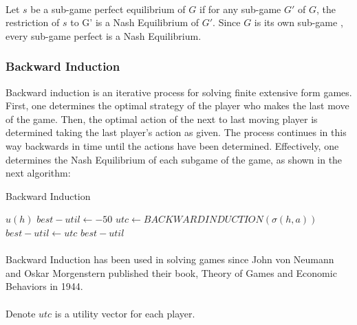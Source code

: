\paragraph{}Let $s$ be a  sub-game perfect equilibrium of $G$ if for any sub-game $G'$ of $G$, the restriction of $s$ to G' is a Nash Equilibrium of $G'$. Since $G$ is its own sub-game , every sub-game perfect is a Nash Equilibrium.

\subsubsection{Backward Induction}
Backward induction is an iterative process for solving finite extensive form games. First, one determines the optimal strategy of the player who makes the last move of the game. Then, the optimal action of the next to last moving player is determined taking the last player's action as given. The process continues in this way backwards in time until the actions have been determined. Effectively, one determines the Nash Equilibrium of each subgame of the game, as shown in the next algorithm:
\begin{algorithm}
\caption{Backward Induction\label{fig:scaled_back}}
\begin{algorithmic}
 \STATE $u(h)$
\ENDIF
\STATE $best-util \leftarrow -50$
\STATE $utc \leftarrow BACKWARDINDUCTION(\sigma(h,a))$ 
\STATE $best-util \leftarrow utc$
\ENDIF
\ENDFOR
\RETURN $best-util$
\end{algorithmic}
\end{algorithm}
\paragraph{}Backward Induction has been used in solving games since John von Neumann and Oskar Morgenstern published their book, Theory of Games and Economic Behaviors in 1944.



\paragraph{} Denote $utc$ is a utility vector for each player.
